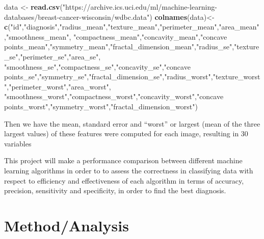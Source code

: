\documentclass[]{article}
\newenvironment{Shaded}{\begin{snugshade}}{\end{snugshade}}
\newcommand{\KeywordTok}[1]{\textcolor[rgb]{0.13,0.29,0.53}{\textbf{#1}}}
\newcommand{\NormalTok}[1]{#1}
\newcommand{\StringTok}[1]{\textcolor[rgb]{0.31,0.60,0.02}{#1}}
\begin{document}
\begin{Shaded}
\begin{Highlighting}[]
\NormalTok{data <-}\StringTok{ }\KeywordTok{read.csv}\NormalTok{(}\StringTok{"https://archive.ics.uci.edu/ml/machine-learning-databases/breast-cancer-wisconsin/wdbc.data"}\NormalTok{)}
\KeywordTok{colnames}\NormalTok{(data)<-}\StringTok{ }\KeywordTok{c}\NormalTok{(}\StringTok{"id"}\NormalTok{,}\StringTok{"diagnosis"}\NormalTok{,}\StringTok{"radius_mean"}\NormalTok{,}\StringTok{"texture_mean"}\NormalTok{,}\StringTok{"perimeter_mean"}\NormalTok{,}\StringTok{"area_mean"}\NormalTok{,}\StringTok{"smoothness_mean"}\NormalTok{,}
                   \StringTok{"compactness_mean"}\NormalTok{,}\StringTok{"concavity_mean"}\NormalTok{,}\StringTok{"concave points_mean"}\NormalTok{,}\StringTok{"symmetry_mean"}\NormalTok{,}\StringTok{"fractal_dimension_mean"}\NormalTok{,}\StringTok{"radius_se"}\NormalTok{,}\StringTok{"texture_se"}\NormalTok{,}\StringTok{"perimeter_se"}\NormalTok{,}\StringTok{"area_se"}\NormalTok{,}
                   \StringTok{"smoothness_se"}\NormalTok{,}\StringTok{"compactness_se"}\NormalTok{,}\StringTok{"concavity_se"}\NormalTok{,}\StringTok{"concave points_se"}\NormalTok{,}\StringTok{"symmetry_se"}\NormalTok{,}\StringTok{"fractal_dimension_se"}\NormalTok{,}\StringTok{"radius_worst"}\NormalTok{,}\StringTok{"texture_worst"}\NormalTok{,}\StringTok{"perimeter_worst"}\NormalTok{,}\StringTok{"area_worst"}\NormalTok{,}
                   \StringTok{"smoothness_worst"}\NormalTok{,}\StringTok{"compactness_worst"}\NormalTok{,}\StringTok{"concavity_worst"}\NormalTok{,}\StringTok{"concave points_worst"}\NormalTok{,}\StringTok{"symmetry_worst"}\NormalTok{,}\StringTok{"fractal_dimension_worst"}\NormalTok{)}
\end{Highlighting}
\end{Shaded}

Then we have the mean, standard error and ``worst'' or largest (mean of
the three largest values) of these features were computed for each
image, resulting in 30 variables

This project will make a performance comparison between different
machine learning algorithms in order to to assess the correctness in
classifying data with respect to efficiency and effectiveness of each
algorithm in terms of accuracy, precision, sensitivity and specificity,
in order to find the best diagnosis.

\hypertarget{methodanalysis}{%
\section{Method/Analysis}\label{methodanalysis}}
\end{document}

